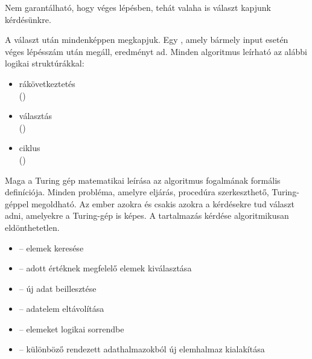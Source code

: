 \documentclass[main.tex]{subfiles}
\begin{document}
  Nem garantálható, hogy véges lépésben,
  tehát valaha is választ kapjunk kérdésünkre.


  A választ  után mindenképpen megkapjuk.
  Egy , amely bármely input esetén
  véges lépésszám után megáll, eredményt ad.
  Minden algoritmus leírható az alábbi logikai struktúrákkal:
  \begin{multicols}{3}
    \begin{itemize}
      \item rákövetkeztetés \\ ()
      \item választás \\ ()
      \item ciklus \\ ()
    \end{itemize}
  \end{multicols}
  Maga a Turing gép matematikai leírása az algoritmus
  fogalmának formális definíciója.
  Minden probléma, amelyre eljárás,
  procedúra szerkeszthető, Turing-géppel megoldható.
  Az ember azokra és csakis azokra a kérdésekre tud választ adni,
  amelyekre a Turing-gép is képes.
  A tartalmazás kérdése algoritmikusan eldönthetetlen.
  \begin{multicols}{2}
    \begin{itemize}
      \item {} – elemek keresése
      
      \item {} – adott értéknek megfelelő elemek kiválasztása
      
      \item {} – új adat beillesztése
      
      \item {} – adatelem eltávolítása
      
      \item {} – elemeket logikai sorrendbe
      
      \item {} – különböző rendezett
      adathalmazokból új elemhalmaz kialakítása
    \end{itemize}
  \end{multicols}


\end{document}
